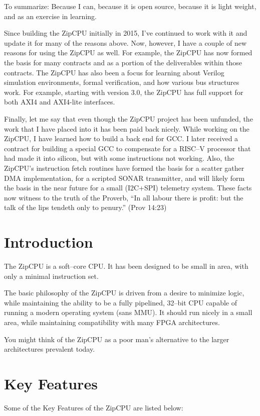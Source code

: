 \documentclass{gqtekspec}
\begin{document}
\begin{preface}
To summarize: Because I can, because it is open source, because it is light
weight, and as an exercise in learning. 

Since building the ZipCPU initially in 2015, I've continued to work with it and
update it for many of the reasons above.  Now, however, I have a couple of new
reasons for using the ZipCPU as well.  For example, the ZipCPU has now formed
the basis for many contracts and as a portion of the deliverables within those
contracts.  The ZipCPU has also been a focus for learning about Verilog
simulation environments, formal verification, and how various bus structures
work.  For example, starting with version 3.0, the ZipCPU has full support for
both AXI4 and AXI4-lite interfaces.

Finally, let me say that even though the ZipCPU project has been unfunded, the
work that I have placed into it has been paid back nicely.  While working on
the ZipCPU, I have learned how to build a back end for GCC.  I later received
a contract for building a special GCC to compensate for a RISC--V processor
that had made it into silicon, but with some instructions not working.  Also,
the ZipCPU's instruction fetch routines have formed the basis for a scatter
gather DMA implementation, for a scripted SONAR transmitter, and will likely
form the basis in the near future for a small (I2C+SPI) telemetry system.
These facts now witness to the truth of the Proverb, ``In all labour there is
profit: but the talk of the lips tendeth only to penury.'' (Prov 14:23)
\end{preface}

\chapter{Introduction}
\setcounter{page}{1}

The ZipCPU is a soft--core CPU.  It has been designed to be small in area,
with only a minimal instruction set.

The basic philosophy of the ZipCPU is driven from a desire to minimize
logic, while maintaining the ability to be a fully pipelined, 32--bit
CPU capable of running a modern operating system (sans MMU).  It should run
nicely in a small area, while maintaining compatibility with many FPGA
architectures.

You might think of the ZipCPU as a poor man's alternative to the larger
architectures prevalent today.
\chapter{Key Features}\label{chap:features}
Some of the Key Features of the ZipCPU are listed below:
\end{document}
